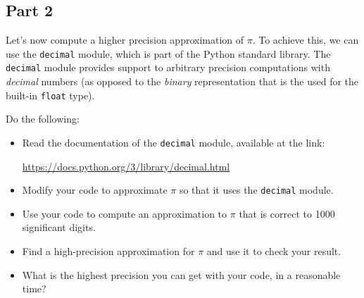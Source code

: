 \documentclass[12pt]{article}
\begin{document}
\subsection{Part 2} Let's now compute a higher precision approximation of $\pi$. To achieve this, we can use the \texttt{decimal} module, which is part of the Python standard library. The \texttt{decimal} module provides support to arbitrary precision computations with \emph{decimal} numbers (as opposed to the \emph{binary} representation that is the used for the built-in \texttt{float} type).

Do the following: 

\begin{itemize}
\item Read the documentation of the \texttt{decimal} module, available at the link:
\begin{center}
\url{https://docs.python.org/3/library/decimal.html}
\end{center}
\item Modify your code to approximate $\pi$ so that it uses the \texttt{decimal} module.
\item Use your code to compute an approximation to $\pi$ that is correct to 1000 significant digits.
\item Find a high-precision approximation for $\pi$ and use it to check your result.
\item What is the highest precision you can get with your code, in a reasonable time?
\end{itemize}
\end{document}

